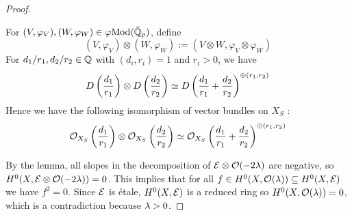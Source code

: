 \documentclass{article}
\begin{document}
\begin{proof}
\begin{lem}
    For $(V , \varphi_V) , (W , \varphi_W) \in \varphi\mathrm{Mod}(\breve{\mathbb{Q}}_p)$,
    define \[
      (V , \varphi_V) \otimes (W , \varphi_W) := 
      (V \otimes W , \varphi_V \otimes \varphi_W)
    \]
    For $d_1 / r_1 , d_2 / r_2 \in \mathbb{Q}$
    with $(d_i , r_i) = 1$ and $r_i > 0$,
    we have \[
      D\left(\frac{d_1}{r_1}\right) \otimes D\left(\frac{d_2}{r_2}\right)
      \simeq D\left(\frac{d_1}{r_1} + \frac{d_2}{r_2}\right)^{\oplus (r_1 , r_2)}
    \]
    Hence we have the following isomorphism of vector bundles on $X_S$ :
    \[
      \mathcal{O}_{X_S}\left(\frac{d_1}{r_1}\right) \otimes \mathcal{O}_{X_S}\left(\frac{d_2}{r_2}\right)
      \simeq 
      \mathcal{O}_{X_S}\left(\frac{d_1}{r_1} + \frac{d_2}{r_2}\right)^{\oplus (r_1 , r_2)}
    \]
    \cite[Prop. 5.6.23]{FF18}
  \end{lem}
  By the lemma, 
  all slopes in the decomposition of $\mathcal{E} \otimes \mathcal{O}(- 2\lambda)$ are negative,
  so $H^0(X , \mathcal{E} \otimes \mathcal{O}(- 2\lambda)) = 0$.
  This implies that for all $f \in H^0(X , \mathcal{O}(\lambda)) \subseteq H^0(X , \mathcal{E})$
  we have $f^2 = 0$.
  Since $\mathcal{E}$ is étale, $H^0(X , \mathcal{E})$ is a reduced ring
  so $H^0(X , \mathcal{O}(\lambda)) = 0$,
  which is a contradiction because $\lambda > 0$.
\end{proof}


  
\end{document}
